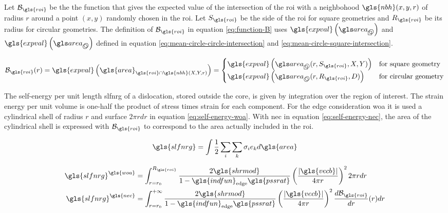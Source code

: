 %

\newpage

Let \( \mathcal{B}_{\gls{roi}} \) be the the function that gives the expected value of the intersection of the \gls{roi} with a neighbohood \( \gls{nbh}(x, y, r) \) of radius \( r \) around a point \( ( x, y ) \) randomly chosen in the \gls{roi}.
Let \( S_{\gls{roi}} \) be the side of the \gls{roi} for square geometries and \( R_{\gls{roi}} \) be its radius for circular geometries.
The definition of \( \mathcal{B}_{\gls{roi}} \) in equation \eqref{eq:function-B} uses \( \gls{expval} \left( \cirsqr \right) \) and \( \gls{expval} \left( \circir \right) \) defined in equation \eqref{eq:mean-circle-circle-intersection} and \eqref{eq:mean-circle-square-intersection}.

\begin{equation}\label{eq:function-B}
  \mathcal{B}_{\gls{roi}}(r) =
    \gls{expval} \left( \gls{area}_{\gls{roi} \cap \gls{nbh}(X, Y, r)} \right) =
    \begin{cases}
      \gls{expval} \left( \cirsqr(r, S_{\gls{roi}}, X, Y) \right)
      & \text{for square geometry} \\
      \gls{expval} \left( \circir(r, R_{\gls{roi}}, D) \right)
      & \text{for circular geometry} \\
    \end{cases}
\end{equation}

\bigskip

The self-energy per unit length \gls{slfnrg} of a dislocation, stored outside the core, is given by integration over the region of interest.
The strain energy per unit volume is one-half the product of stress times strain for each component.
For the edge consideration \gls{woa} it is used a cylindrical shell of radius \( r \) and surface \( 2 \pi r dr \) in equation \eqref{eq:self-energy-woa}.
With \gls{nec} in equation \eqref{eq:self-energy-nec}, the area of the cylindrical shell is expressed with \( \mathcal{B}_{\gls{roi}} \) to correspond to the area actually included in the \gls{roi}.

\begin{equation}
  \gls{slfnrg} =
    \int \frac{1}{2} \sum_i \sum_k \sigma_i e_k d\gls{area}
\end{equation}

\begin{align}
  \gls{slfnrg}^{\gls{woa}} &=
    \int_{r=r_0}^{R_{\gls{roi}}} \frac{2 \gls{shrmod}}{1 - \gls{indfun}_{\mathrm{edge}} \gls{pssrat}} \left( \frac{| \gls{vecb} |}{4 \pi r} \right)^2 2 \pi r dr
    \label{eq:self-energy-woa}
  \\
  \gls{slfnrg}^{\gls{nec}} &=
    \int_{r=r_0}^{+\infty} \frac{2 \gls{shrmod}}{1 - \gls{indfun}_{\mathrm{edge}} \gls{pssrat}} \left( \frac{| \gls{vecb} |}{4 \pi r} \right)^2 \frac{d \mathcal{B}_{\gls{roi}}}{dr} (r) dr
    \label{eq:self-energy-nec}
\end{align}

